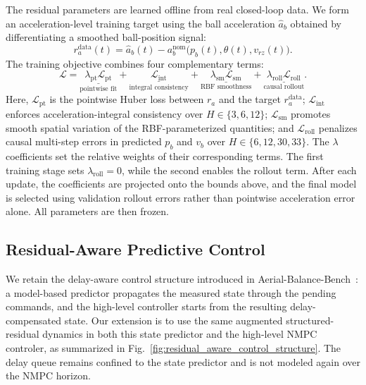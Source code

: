\documentclass[letterpaper, 10 pt, conference]{ieeeconf}  %
\begin{document}
The residual parameters are learned offline from real closed-loop data. We form an acceleration-level training
target using the ball acceleration $\hat a_b$ obtained by differentiating a smoothed ball-position signal:
\begin{equation}
    r_a^{\mathrm{data}}(t)
    =\hat a_b(t)-a_b^{\mathrm{nom}}
    \bigl(p_b(t),\theta(t),v_{rz}(t)\bigr).
    \label{eq:residual_acceleration_target}
\end{equation}
The training objective combines four complementary terms:
\begin{equation}
    \mathcal L=
    \underset{\text{pointwise fit}}{\underline{\lambda_{\mathrm{pt}}\mathcal L_{\mathrm{pt}}}}
    +\underset{\text{integral consistency}}{\underline{\mathcal L_{\mathrm{int}}}}
    +\underset{\text{RBF smoothness}}{\underline{\lambda_{\mathrm{sm}}\mathcal L_{\mathrm{sm}}}}
    +\underset{\text{causal rollout}}{\underline{\lambda_{\mathrm{roll}}\mathcal L_{\mathrm{roll}}}}.
    \label{eq:structured_residual_training_loss}
\end{equation}
Here, $\mathcal L_{\mathrm{pt}}$ is the pointwise Huber loss between $r_a$ and the target
$r_a^{\mathrm{data}}$; $\mathcal L_{\mathrm{int}}$ enforces acceleration-integral consistency over
$H\in\{3,6,12\}$; $\mathcal L_{\mathrm{sm}}$ promotes smooth spatial variation of the RBF-parameterized
quantities; and $\mathcal L_{\mathrm{roll}}$ penalizes causal multi-step errors in predicted $p_b$ and $v_b$ over
$H\in\{6,12,30,33\}$. The $\lambda$ coefficients set the relative weights of their corresponding terms. The
first training stage sets $\lambda_{\mathrm{roll}}=0$, while the second enables the rollout term. After each
update, the coefficients are projected onto the bounds above, and the final model is selected using validation
rollout errors rather than pointwise acceleration error alone. All parameters are then frozen.


\subsection{Residual-Aware Predictive Control}
We retain the delay-aware control structure introduced in
Aerial-Balance-Bench~\cite{liu2026aerialBalanceBench}: a model-based predictor propagates the measured state
through the pending commands, and the high-level controller starts from the resulting delay-compensated state.
Our extension is to use the same augmented structured-residual dynamics in both this state predictor and the high-level NMPC controler,
as summarized in Fig.~\ref{fig:residual_aware_control_structure}. The delay queue remains confined to the state
predictor and is not modeled again over the NMPC horizon.
\end{document}
